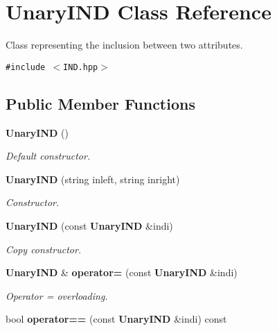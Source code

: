 \section{Unary\-IND Class Reference}
\label{class_unary_i_n_d}
Class representing the inclusion between two attributes.  


{\tt \#include $<$IND.hpp$>$}

\subsection*{Public Member Functions}
\begin{CompactItemize}
\item 
{\bf Unary\-IND} ()\label{class_unary_i_n_d_94f0ab52803c2a3695768e55dcfd9b8a}

\begin{CompactList}\small\item\em Default constructor. \item\end{CompactList}\item 
{\bf Unary\-IND} (string inleft, string inright)\label{class_unary_i_n_d_b37ed0b8cf369be738c14aadeb343656}

\begin{CompactList}\small\item\em Constructor. \item\end{CompactList}\item 
{\bf Unary\-IND} (const {\bf Unary\-IND} \&indi)\label{class_unary_i_n_d_ca18f4ff42a4411b25f050d8086b834d}

\begin{CompactList}\small\item\em Copy constructor. \item\end{CompactList}\item 
{\bf Unary\-IND} \& {\bf operator=} (const {\bf Unary\-IND} \&indi)\label{class_unary_i_n_d_117105999c93d625df53fbba0aa87a97}

\begin{CompactList}\small\item\em Operator = overloading. \item\end{CompactList}\item 
bool {\bf operator==} (const {\bf Unary\-IND} \&indi) const \label{class_unary_i_n_d_915b2dccf5c5c1af8eb4d50736f13df9}


\end{CompactItemize}
